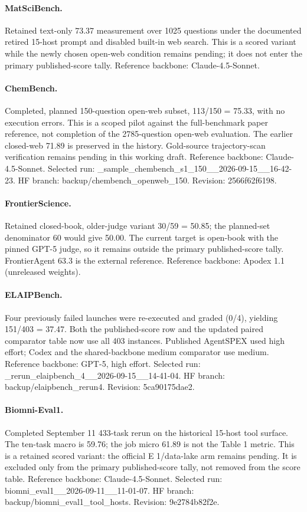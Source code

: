 \paragraph{MatSciBench.} Retained text-only 73.37 measurement over 1025 questions under the documented retired 15-host prompt and disabled built-in web search. This is a scored variant while the newly chosen open-web condition remains pending; it does not enter the primary published-score tally. Reference backbone: Claude-4.5-Sonnet.
\paragraph{ChemBench.} Completed, planned 150-question open-web subset, 113/150 = 75.33, with no execution errors. This is a scoped pilot against the full-benchmark paper reference, not completion of the 2785-question open-web evaluation. The earlier closed-web 71.89 is preserved in the history. Gold-source trajectory-scan verification remains pending in this working draft. Reference backbone: Claude-4.5-Sonnet. Selected run: \_sample\_chembench\_s1\_150\_\_2026-09-15\_\_16-42-23. HF branch: backup/chembench\_openweb\_150. Revision: 2566f62f6198.
\paragraph{FrontierScience.} Retained closed-book, older-judge variant 30/59 = 50.85; the planned-set denominator 60 would give 50.00. The current target is open-book with the pinned GPT-5 judge, so it remains outside the primary published-score tally. FrontierAgent 63.3 is the external reference. Reference backbone: Apodex 1.1 (unreleased weights).
\paragraph{ELAIPBench.} Four previously failed launches were re-executed and graded (0/4), yielding 151/403 = 37.47. Both the published-score row and the updated paired comparator table now use all 403 instances. Published AgentSPEX used high effort; Codex and the shared-backbone medium comparator use medium. Reference backbone: GPT-5, high effort. Selected run: \_rerun\_elaipbench\_4\_\_2026-09-15\_\_14-41-04. HF branch: backup/elaipbench\_rerun4. Revision: 5ca90175dae2.
\paragraph{Biomni-Eval1.} Completed September 11 433-task rerun on the historical 15-host tool surface. The ten-task macro is 59.76; the job micro 61.89 is not the Table 1 metric. This is a retained scored variant: the official E 1/data-lake arm remains pending. It is excluded only from the primary published-score tally, not removed from the score table. Reference backbone: Claude-4.5-Sonnet. Selected run: biomni\_eval1\_\_2026-09-11\_\_11-01-07. HF branch: backup/biomni\_eval1\_tool\_hosts. Revision: 9e2784b82f2e.
